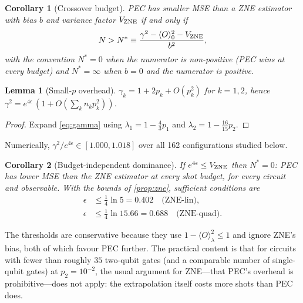 \documentclass[aps,pra,reprint,amsmath,amssymb,nofootinbib,superscriptaddress]{revtex4-2}
\newtheorem{corollary}{Corollary}
\newtheorem{lemma}{Lemma}
\theoremstyle{remark}
\newcommand{\eps}{\epsilon}
\begin{document}
\begin{corollary}[Crossover budget]
\label{cor:nstar}
PEC has smaller MSE than a ZNE estimator with bias $b$ and variance factor $V_{\rm ZNE}$ if and only if
\begin{equation}
N > N^* \equiv \frac{\gamma^2-\langle O\rangle_0^2-V_{\rm ZNE}}{b^2},
\label{eq:nstar}
\end{equation}
with the convention $N^*=0$ when the numerator is non-positive (PEC wins at every budget) and $N^*=\infty$ when $b=0$ and the numerator is positive.
\end{corollary}

\begin{lemma}[Small-$p$ overhead]
\label{lem:gamma}
$\gamma_k = 1+2p_k+O(p_k^2)$ for $k=1,2$, hence $\gamma^2 = e^{4\eps}\,(1+O(\sum_k n_kp_k^2))$.
\end{lemma}
\begin{proof}
Expand \cref{eq:gamma} using $\lambda_1=1-\tfrac43p_1$ and $\lambda_2=1-\tfrac{16}{15}p_2$.
\end{proof}
Numerically, $\gamma^2/e^{4\eps}\in[1.000,1.018]$ over all 162 configurations studied below.

\begin{corollary}[Budget-independent dominance]
\label{cor:threshold}
If $e^{4\eps}\le V_{\rm ZNE}$ then $N^*=0$: PEC has lower MSE than the ZNE estimator at every shot budget, for every circuit and observable. With the bounds of \cref{prop:zne}, sufficient conditions are
\begin{align}
\eps&\le \tfrac14\ln 5 = 0.402\quad \text{(ZNE-lin)},\nonumber\\
\eps&\le \tfrac14\ln 15.66 = 0.688\quad \text{(ZNE-quad)}.
\end{align}
\end{corollary}
The thresholds are conservative because they use $1-\langle O\rangle_\lambda^2\le1$ and ignore ZNE's bias, both of which favour PEC further. The practical content is that for circuits with fewer than roughly $35$ two-qubit gates (and a comparable number of single-qubit gates) at $p_2=10^{-2}$, the usual argument for ZNE---that PEC's overhead is prohibitive---does not apply: the extrapolation itself costs more shots than PEC does.
\end{document}
